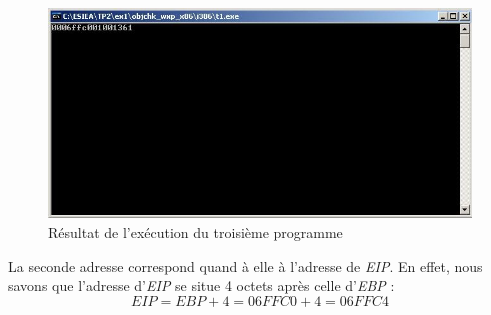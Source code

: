 \begin{figure}[H]
  \centering
  \includegraphics[width=.9\textwidth]{img/205.JPG}
  \caption{Résultat de l'exécution du troisième programme}
  \label{img:6}
\end{figure}
La seconde adresse correspond quand à elle à l'adresse de \textit{EIP}. En effet, nous savons que l'adresse d'\textit{EIP} se situe 4 octets après celle d'\textit{EBP} :
\begin{equation}
  EIP = EBP + 4 = 06FFC0 + 4 = 06FFC4
\end{equation}
